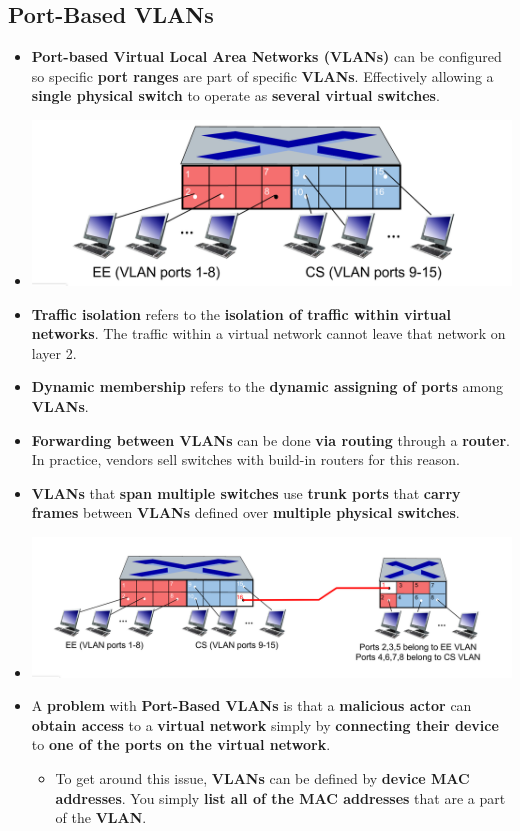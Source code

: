\documentclass{article}
\begin{document}
    \subsection*{Port-Based VLANs}
    \begin{itemize}
        \item \textbf{Port-based Virtual Local Area Networks (VLANs)} can be configured so specific \textbf{port ranges} are part of specific \textbf{VLANs}. Effectively allowing a \textbf{single physical switch} to operate as \textbf{several virtual switches}.
        \item[] \includegraphics[width=\textwidth - 25pt]{images/VLAN.png}
        \item \textbf{Traffic isolation} refers to the \textbf{isolation of traffic within virtual networks}. The traffic within a virtual network cannot leave that network on layer 2.
        \item \textbf{Dynamic membership} refers to the \textbf{dynamic assigning of ports} among \textbf{VLANs}.
        \item \textbf{Forwarding between VLANs} can be done \textbf{via routing} through a \textbf{router}. In practice, vendors sell switches with build-in routers for this reason.
        \item \textbf{VLANs} that \textbf{span multiple switches} use \textbf{trunk ports} that \textbf{carry frames} between \textbf{VLANs} defined over \textbf{multiple physical switches}.
        \item[] \includegraphics[width=\textwidth - 25pt]{images/Multi-VLANs.png} 
        \item A \textbf{problem} with \textbf{Port-Based VLANs} is that a \textbf{malicious actor} can \textbf{obtain access} to a \textbf{virtual network} simply by \textbf{connecting their device} to \textbf{one of the ports on the virtual network}.
        \begin{itemize}
            \item To get around this issue, \textbf{VLANs} can be defined by \textbf{device MAC addresses}. You simply \textbf{list all of the MAC addresses} that are a part of the \textbf{VLAN}.
        \end{itemize}
    \end{itemize}
\end{document}
